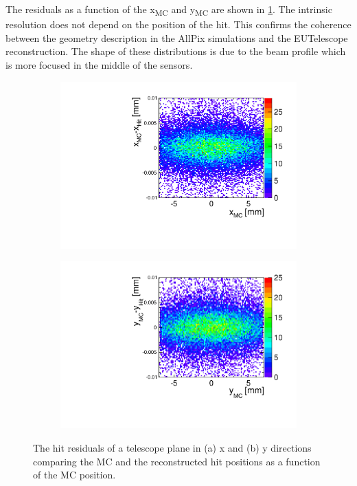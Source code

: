 The residuals as a function of the x\textsubscript{MC} and
y\textsubscript{MC} are shown in \cref{fig:TelPlane0_MC_hit_2D}. The
intrinsic resolution does not depend on the position of the hit. This
confirms the coherence between the geometry description in the AllPix
simulations and the EUTelescope reconstruction. The shape of these
distributions is due to the beam profile which is more focused in the
middle of the sensors.

\begin{figure}[htbp] \centering
  \begin{subfigure}[b]{0.45\textwidth}
    \includegraphics[width=\textwidth]{figures/Telescope/telescopePlane0_MC_vs_hit_x_2D.pdf}
    \caption{}
  \end{subfigure}\hfill
  \begin{subfigure}[b]{0.45\textwidth}
    \includegraphics[width=\textwidth]{figures/Telescope/telescopePlane0_MC_vs_hit_y_2D.pdf}
    \caption{}
  \end{subfigure}
  \caption{The hit residuals of a telescope plane in (a) x and (b) y
    directions comparing the MC and the reconstructed hit positions as
    a function of the MC position.}
  \label{fig:TelPlane0_MC_hit_2D}
\end{figure}


